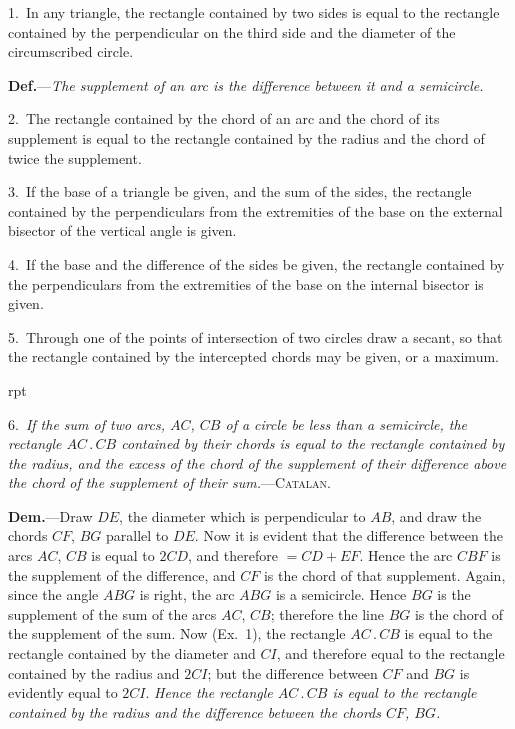\documentclass[oneside]{book}
\newcommand\imgflow[3]{
\setcounter{wrapwidth}{#1}
\begin{wrapfigure}[#2]{r}{\value{wrapwidth}pt}
\begin{center}
\vspace{-0.3in}
\end{center}
\end{wrapfigure}
}
\begin{document}
\begin{footnotesize}
1.~In any triangle, the rectangle contained by two sides is
equal to the rectangle contained by the perpendicular on the third
side and the diameter of the circumscribed circle.

\textbf{Def.}---\emph{The supplement of an arc is the difference between it and
a semicircle.}

2.~The rectangle contained by the chord of an arc and the
chord of its supplement is equal to the rectangle contained by
the radius and the chord of twice the supplement.

3.~If the base of a triangle be given, and the sum of the sides,
the rectangle contained by the perpendiculars from the extremities
of the base on the external bisector of the vertical angle is given.

4.~If the base and the difference of the sides be given, the
rectangle contained by the perpendiculars from the extremities
of the base on the internal bisector is given.

5.~Through one of the points of intersection of two circles
draw a secant, so that the rectangle contained by the intercepted
chords may be given, or a maximum.

\imgflow{135}{16}{f147}

6.~\emph{If the sum of two arcs, $AC$, $CB$ of a circle be less than a
semicircle, the rectangle $AC\,.\,CB$
contained by their chords is equal
to the rectangle contained by the
radius, and the excess of the chord
of the supplement of their difference
above the chord of the supplement of
their sum.}---\textsc{Catalan.}

\textbf{Dem.}---Draw $DE$, the diameter
which is perpendicular to $AB$, and
draw the chords $CF$, $BG$ parallel
to $DE$. Now it is evident that the
difference between the arcs $AC$, $CB$
is equal to $2 CD$, and therefore
$= CD + EF$. Hence the arc $CBF$
is the supplement of the difference, and $CF$ is the chord of that
supplement. Again, since the angle $ABG$ is right, the arc $ABG$
is a semicircle. Hence $BG$ is the supplement of the sum of the
arcs $AC$, $CB$; therefore the line $BG$ is the chord of the supplement
of the sum. Now (Ex.~1), the rectangle $AC\,.\,CB$ is equal
to the rectangle contained by the diameter and $CI$, and therefore
equal to the rectangle contained by the radius and $2 CI$; but the
difference between $CF$ and $BG$ is evidently equal to $2 CI$. \emph{Hence
the rectangle $AC\,.\,CB$ is equal to the rectangle contained by the
radius and the difference between the chords $CF$, $BG$.}


\end{footnotesize}
\end{document}
